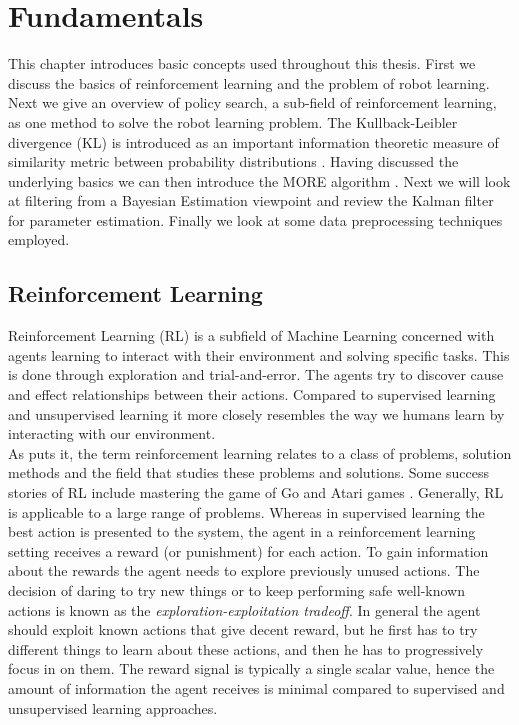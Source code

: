
\chapter{Fundamentals}
This chapter introduces basic concepts used throughout this thesis.
First we discuss the basics of reinforcement learning and
the problem of robot learning.
Next we give an overview of policy search,
a sub-field of reinforcement learning,
as one method to solve the robot learning problem.
The Kullback-Leibler divergence (KL) is
introduced as an important information theoretic
measure of similarity metric between probability
distributions \citep{kullback1951information}.
Having discussed the underlying basics we can then
introduce the MORE algorithm \citep{abdolmaleki2015model}.
Next we will look at filtering from a Bayesian Estimation viewpoint and
review the Kalman filter for parameter estimation. Finally we
look at some data preprocessing techniques employed.

\section{Reinforcement Learning}
Reinforcement Learning (RL) is a subfield of Machine Learning
concerned with agents
learning to interact with their environment and
solving specific tasks.
This is done through exploration and trial-and-error. The agents
try to discover cause and effect relationships between their actions.
Compared to supervised learning and unsupervised learning it
more closely resembles the way we humans learn by interacting
with our environment. \\
As \citet{sutton2018reinforcement} puts it,
the term reinforcement learning relates to a class of problems,
solution methods and the field that studies these problems and solutions.
Some success stories of RL include mastering the game of Go
\citep{silver2016mastering} and Atari games \citep{mnih2013playing}.
Generally, RL is applicable to a large range of problems.
Whereas in supervised learning the best action is presented to the system,
the agent in a reinforcement learning setting receives a
reward (or punishment) for each action.
To gain information about the rewards the agent needs
to explore previously unused actions.
The decision of daring to try new things or to keep performing safe
well-known actions is known as the
\textit{exploration-exploitation tradeoff}.
In general the agent should exploit known actions that
give decent reward, but he first
has to try different things to learn about these actions,
and then he has to progressively focus in on them.
The reward signal is typically a single scalar value,
hence the amount of information
the agent receives is minimal compared to
supervised and unsupervised learning approaches.

